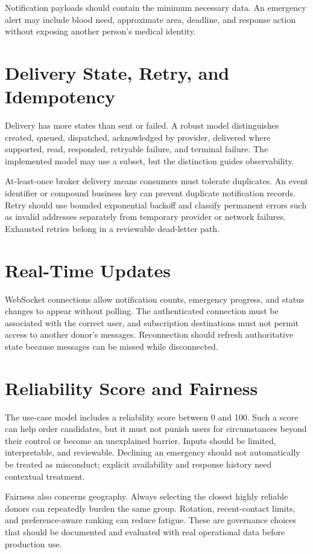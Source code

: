 Notification payloads should contain the minimum necessary data. An emergency alert may include blood need, approximate area, deadline, and response action without exposing another person's medical identity.

\section{Delivery State, Retry, and Idempotency}
Delivery has more states than sent or failed. A robust model distinguishes created, queued, dispatched, acknowledged by provider, delivered where supported, read, responded, retryable failure, and terminal failure. The implemented model may use a subset, but the distinction guides observability.

At-least-once broker delivery means consumers must tolerate duplicates. An event identifier or compound business key can prevent duplicate notification records. Retry should use bounded exponential backoff and classify permanent errors such as invalid addresses separately from temporary provider or network failures. Exhausted retries belong in a reviewable dead-letter path.

\section{Real-Time Updates}
WebSocket connections allow notification counts, emergency progress, and status changes to appear without polling. The authenticated connection must be associated with the correct user, and subscription destinations must not permit access to another donor's messages. Reconnection should refresh authoritative state because messages can be missed while disconnected.

\section{Reliability Score and Fairness}
The use-case model includes a reliability score between 0 and 100. Such a score can help order candidates, but it must not punish users for circumstances beyond their control or become an unexplained barrier. Inputs should be limited, interpretable, and reviewable. Declining an emergency should not automatically be treated as misconduct; explicit availability and response history need contextual treatment.

Fairness also concerns geography. Always selecting the closest highly reliable donors can repeatedly burden the same group. Rotation, recent-contact limits, and preference-aware ranking can reduce fatigue. These are governance choices that should be documented and evaluated with real operational data before production use.

